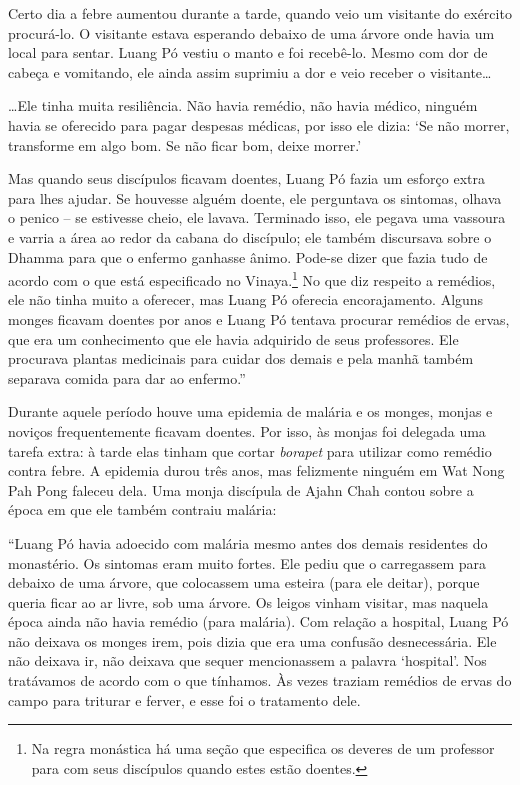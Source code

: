 Certo dia a febre aumentou durante a tarde, quando veio um visitante do
exército procurá-lo. O visitante estava esperando debaixo de uma árvore
onde havia um local para sentar. Luang Pó vestiu o manto e foi
recebê-lo. Mesmo com dor de cabeça e vomitando, ele ainda assim suprimiu
a dor e veio receber o visitante\ldots{}

\ldots{}Ele tinha muita resiliência. Não havia remédio, não havia
médico, ninguém havia se oferecido para pagar despesas médicas, por isso
ele dizia: `Se não morrer, transforme em algo bom. Se não ficar bom,
deixe morrer.'

Mas quando seus discípulos ficavam doentes, Luang Pó fazia um esforço
extra para lhes ajudar. Se houvesse alguém doente, ele perguntava os
sintomas, olhava o penico -- se estivesse cheio, ele lavava. Terminado
isso, ele pegava uma vassoura e varria a área ao redor da cabana do
discípulo; ele também discursava sobre o Dhamma para que o enfermo
ganhasse ânimo. Pode-se dizer que fazia tudo de acordo com o que está
especificado no Vinaya.\footnote{Na regra monástica há uma seção que
  especifica os deveres de um professor para com seus discípulos quando
  estes estão doentes.} No que diz respeito a remédios, ele não tinha
muito a oferecer, mas Luang Pó oferecia encorajamento. Alguns monges
ficavam doentes por anos e Luang Pó tentava procurar remédios de ervas,
que era um conhecimento que ele havia adquirido de seus professores. Ele
procurava plantas medicinais para cuidar dos demais e pela manhã também
separava comida para dar ao enfermo.''

Durante aquele período houve uma epidemia de malária e os monges, monjas
e noviços frequentemente ficavam doentes. Por isso, às monjas foi
delegada uma tarefa extra: à tarde elas tinham que cortar \emph{borapet}
para utilizar como remédio contra febre. A epidemia durou três anos, mas
felizmente ninguém em Wat Nong Pah Pong faleceu dela. Uma monja
discípula de Ajahn Chah contou sobre a época em que ele também contraiu
malária:

``Luang Pó havia adoecido com malária mesmo antes dos demais residentes
do monastério. Os sintomas eram muito fortes. Ele pediu que o
carregassem para debaixo de uma árvore, que colocassem uma esteira (para
ele deitar), porque queria ficar ao ar livre, sob uma árvore. Os leigos
vinham visitar, mas naquela época ainda não havia remédio (para
malária). Com relação a hospital, Luang Pó não deixava os monges irem,
pois dizia que era uma confusão desnecessária. Ele não deixava ir, não
deixava que sequer mencionassem a palavra `hospital'. Nos tratávamos de
acordo com o que tínhamos. Às vezes traziam remédios de ervas do campo
para triturar e ferver, e esse foi o tratamento dele.

